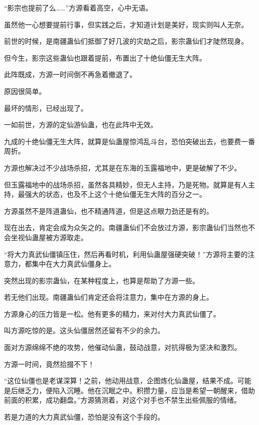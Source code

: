 
\begin{this_body}

“影宗也提前了么……”方源看着高空，心中无语。

虽然他一心想要提前行事，但实践之后，才知道计划是美好，现实则叫人无奈。

前世的时候，是南疆蛊仙们抵御了好几波的灾劫之后，影宗蛊仙们才陡然现身。

但今生，影宗这些蛊仙也跟着提前，布置出了十绝仙僵无生大阵。

此阵既成，方源一时间倒不再急着撤退了。

原因很简单。

最坏的情形，已经出现了。

一如前世，方源的定仙游仙蛊，也在此阵中无效。

九成的十绝仙僵无生大阵，就算是仙蛊屋惊鸿乱斗台，恐怕突破出去，也要费一番周折。

方源也解决过不少战场杀招，尤其是在东海的玉露福地中，更是破解了不少。

但玉露福地中的战场杀招，虽然各具精妙，但无人主持，乃是死物。就算是有人主持，最强大的状态，也及不上这个十绝仙僵无生大阵的百分之一。

方源虽然不是阵道蛊仙，也不精通阵道，但是这点眼力劲还是有的。

现在出去，肯定会成为众矢之的。南疆蛊仙们不会放过方源，影宗蛊仙们当然也不会坐视仙蛊屋被方源取走。

“将大力真武仙僵镇压住，然后再看时机，利用仙蛊屋强硬突破！”方源将主要的注意力，都集中在大力真武仙僵身上。

突然出现的影宗蛊仙，在某种程度上，也算是帮助了方源一些。

若无他们出现。南疆蛊仙们肯定还会将注意力，集中在方源的身上。

方源身心的压力皆是一松。他有更多的精力，来对付大力真武仙僵了。

叫方源吃惊的是。这头仙僵居然还留有不少的余力。

面对方源绵绵不绝的攻势，他催动仙蛊，鼓动战意，对抗得极为坚决和激烈。

方源一时间，竟然拾掇不下！

“这位仙僵也是老谋深算！之前，他动用战意，企图炼化仙蛊屋，结果不成。可能是后继乏力，便陷入沉睡。他在沉眠之中。积攒力量，应当是希望一朝醒来，借助前面的积累，成功翻盘。”方源猜测着，对这个对手也不禁生出些佩服的情绪。

若是力道的大力真武仙僵，恐怕是没有这个手段的。


\end{this_body}
